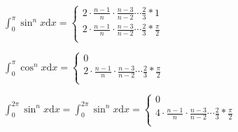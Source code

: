 \begin{spacing}{\hangju}
    \noindent $\int_{0}^{\pi}{\sin^n{x}}\mathrm{d}x = \begin{cases}
        2 \cdot \frac{n - 1}{n} \cdot \frac{n - 3}{n - 2} \cdots \frac{2}{3} * 1 \\
        2 \cdot \frac{n - 1}{n} \cdot \frac{n - 3}{n - 2} \cdots \frac{2}{3} * \frac{\pi}{2} \\
    \end{cases}$

    \noindent $\int_{0}^{\pi}{\cos^n{x}}\mathrm{d}x = \begin{cases}
        0 \\
        2 \cdot \frac{n - 1}{n} \cdot \frac{n - 3}{n - 2} \cdots \frac{2}{3} * \frac{\pi}{2} \\
    \end{cases}$

    \noindent $\int_{0}^{2\pi}{\sin^n{x}}\mathrm{d}x = \int_{0}^{2\pi}{\sin^n{x}}\mathrm{d}x =
    \begin{cases}
        0 \\
        4 \cdot \frac{n - 1}{n} \cdot \frac{n - 3}{n - 2} \cdots \frac{2}{3} * \frac{\pi}{2} \\
    \end{cases}$
\end{spacing}
